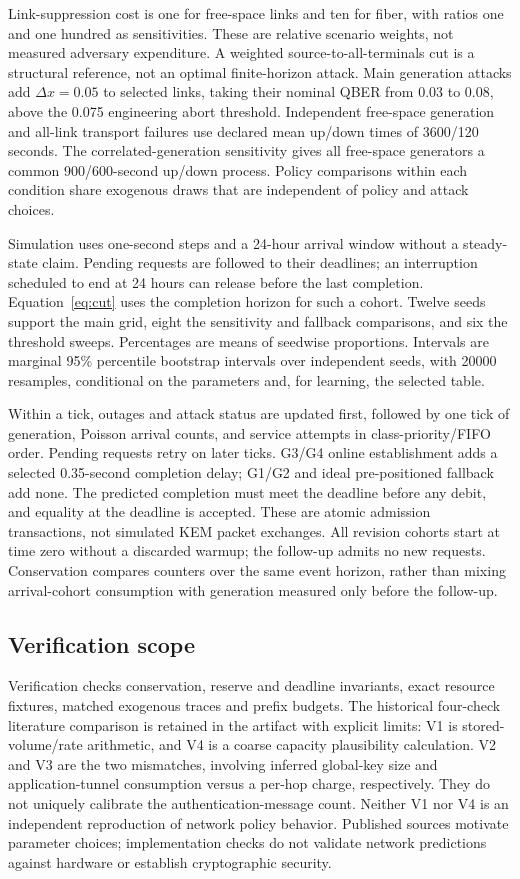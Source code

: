 \documentclass[conference,a4paper]{IEEEtran}
\begin{document}
Link-suppression cost is one for free-space links and ten for fiber, with ratios one and one hundred as sensitivities. These are relative scenario weights, not measured adversary expenditure. A weighted source-to-all-terminals cut is a structural reference, not an optimal finite-horizon attack. Main generation attacks add $\Delta x=0.05$ to selected links, taking their nominal QBER from 0.03 to 0.08, above the 0.075 engineering abort threshold. Independent free-space generation and all-link transport failures use declared mean up/down times of 3600/120 seconds. The correlated-generation sensitivity gives all free-space generators a common 900/600-second up/down process. Policy comparisons within each condition share exogenous draws that are independent of policy and attack choices.

Simulation uses one-second steps and a 24-hour arrival window without a steady-state claim. Pending requests are followed to their deadlines; an interruption scheduled to end at 24 hours can release before the last completion. Equation~\ref{eq:cut} uses the completion horizon for such a cohort. Twelve seeds support the main grid, eight the sensitivity and fallback comparisons, and six the threshold sweeps. Percentages are means of seedwise proportions. Intervals are marginal 95\% percentile bootstrap intervals over independent seeds, with 20000 resamples, conditional on the parameters and, for learning, the selected table.

Within a tick, outages and attack status are updated first, followed by one tick of generation, Poisson arrival counts, and service attempts in class-priority/FIFO order. Pending requests retry on later ticks. G3/G4 online establishment adds a selected 0.35-second completion delay; G1/G2 and ideal pre-positioned fallback add none. The predicted completion must meet the deadline before any debit, and equality at the deadline is accepted. These are atomic admission transactions, not simulated KEM packet exchanges. All revision cohorts start at time zero without a discarded warmup; the follow-up admits no new requests. Conservation compares counters over the same event horizon, rather than mixing arrival-cohort consumption with generation measured only before the follow-up.

\subsection{Verification scope}
Verification checks conservation, reserve and deadline invariants, exact resource fixtures, matched exogenous traces and prefix budgets. The historical four-check literature comparison is retained in the artifact with explicit limits: V1 is stored-volume/rate arithmetic, and V4 is a coarse capacity plausibility calculation. V2 and V3 are the two mismatches, involving inferred global-key size and application-tunnel consumption versus a per-hop charge, respectively. They do not uniquely calibrate the authentication-message count. Neither V1 nor V4 is an independent reproduction of network policy behavior. Published sources motivate parameter choices; implementation checks do not validate network predictions against hardware or establish cryptographic security.
\end{document}
